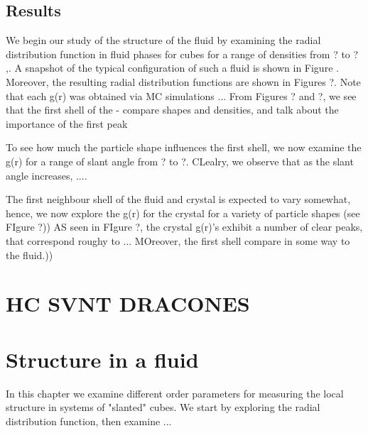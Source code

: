 \documentclass[thesis]{subfiles}
\begin{document}
\subsection{Results}

We begin our study of the structure of the fluid by examining the radial distribution function in fluid phases for cubes  for a range of densities from ? to ? ,. A snapshot of the typical configuration of such a fluid is shown in Figure . Moreover,  the resulting radial distribution functions are shown in Figures ?.  Note that each g(r) was obtained via MC simulations ...  From Figures ? and ?, we see that the first shell of the 
- compare shapes and densities, and talk about the importance of the first peak

To see how much the particle shape influences the first shell, we now examine the g(r) for a range of slant angle from ? to ?.  CLealry, we observe that as the slant angle increases, ....


The first neighbour shell of the fluid and crystal is expected to vary somewhat, hence, we now explore the g(r) for the crystal for a variety of particle shapes (see FIgure ?))
AS seen in FIgure ?, the crystal g(r)'s exhibit a number of clear peaks, that correspond roughy to ...  MOreover, the first shell compare in some way to the fluid.))



\section{HC SVNT DRACONES}

\section{Structure in a fluid}

In this chapter we examine different order parameters for measuring the local structure in systems of "slanted" cubes.  We start by exploring the radial distribution function, then examine ...





\end{document}
